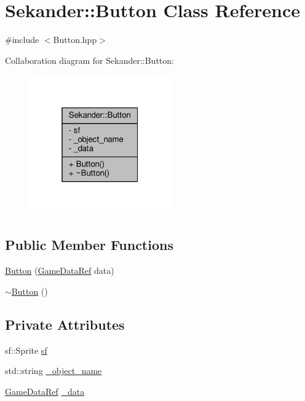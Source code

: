 \hypertarget{classSekander_1_1Button}{}\section{Sekander\+:\+:Button Class Reference}
\label{classSekander_1_1Button}


{\ttfamily \#include $<$Button.\+hpp$>$}



Collaboration diagram for Sekander\+:\+:Button\+:
\nopagebreak
\begin{figure}[H]
\begin{center}
\leavevmode
\includegraphics[width=172pt]{classSekander_1_1Button__coll__graph}
\end{center}
\end{figure}
\subsection*{Public Member Functions}
\begin{DoxyCompactItemize}
\item 
\hyperlink{classSekander_1_1Button_a97a6651579e507d76aafcd5734b3df34}{Button} (\hyperlink{namespaceSekander_a1d69b002ba2d23020901c28f0def5e16}{Game\+Data\+Ref} data)
\item 
\hyperlink{classSekander_1_1Button_a4c70ac65fcbc97dc548b57bc1ef87157}{$\sim$\+Button} ()
\end{DoxyCompactItemize}
\subsection*{Private Attributes}
\begin{DoxyCompactItemize}
\item 
sf\+::\+Sprite \hyperlink{classSekander_1_1Button_a764d03180d09cc16d5b0075e64ed690e}{sf}
\item 
std\+::string \hyperlink{classSekander_1_1Button_a886b33cb3c488812c52b7aba318b5f17}{\+\_\+object\+\_\+name}
\item 
\hyperlink{namespaceSekander_a1d69b002ba2d23020901c28f0def5e16}{Game\+Data\+Ref} \hyperlink{classSekander_1_1Button_a20e3f9a6f7533f122c793a5660305f8a}{\+\_\+data}
\end{DoxyCompactItemize}


